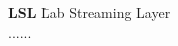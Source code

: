 



\begin{tabbing}

\textbf{LSL} \hspace{2cm} \= Lab Streaming Layer \\[5pt]

......
\end{tabbing}

